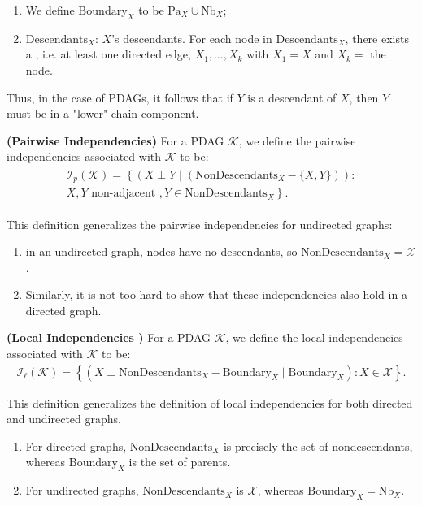 \documentclass{article}
\newcommand{\bfs}[1]{\textbf{({#1}) }}
\begin{document}
\begin{enumerate}
    \item {} We define $\mathrm{Boundary}_{X}$ to be $\mathrm{Pa}_{X} \cup \mathrm{Nb}_{X}$;
    \item $\mathrm{Descendants}_{X}$: $X$'s descendants. For each node in $\mathrm{Descendants}_{X}$, there exists a , i.e. at least one directed edge, $X_{1}, \ldots, X_{k}$ with $X_{1}=X$ and $X_{k}=$ the node. 
\end{enumerate}
Thus, in the case of PDAGs, it follows that if $Y$ is a descendant of $X$, then $Y$ must be in a "lower" chain component.
\begin{defa}\bfs{Pairwise Independencies}
For a PDAG $\mathcal{K}$, we define the pairwise independencies associated with $\mathcal{K}$ to be:
\begin{align*}
\begin{gathered}
\mathcal{I}_{p}(\mathcal{K})=\left\{\left(X \perp Y \mid\left(\mathrm{NonDescendants}_{X}-\{X, Y\}\right)\right):\right. \\
\left.X, Y \text { non-adjacent }, Y \in \mathrm{NonDescendants}_{X}\right\} .
\end{gathered}
\end{align*}
\end{defa}
\begin{rema}
 This definition generalizes the pairwise independencies for undirected graphs: 
 \begin{enumerate}
     \item in an undirected graph, nodes have no descendants, so  $\mathrm{NonDescendants}_{X}=\mathcal{X}$.
     \item Similarly, it is not too hard to show that these independencies also hold in a directed graph.
 \end{enumerate} 
\end{rema}
\begin{defa}\bfs{Local Independencies }
For a PDAG $\mathcal{K}$, we define the local independencies associated with $\mathcal{K}$ to be:
\begin{align*}
\mathcal{I}_{\ell}(\mathcal{K})=\left\{\left(X \perp \mathrm{NonDescendants}_{X}-\mathrm{Boundary}_{X} \mid \mathrm{Boundary}_{X}\right): X \in \mathcal{X}\right\} .
\end{align*}
\end{defa}
\begin{rema}
This definition generalizes the definition of local independencies for both directed and undirected graphs.
\begin{enumerate}
    \item For directed graphs,  $\mathrm{NonDescendants}_{X}$ is precisely the set of nondescendants, whereas  $\mathrm{Boundary}_{X}$ is the set of parents.
    \item For undirected graphs,  $\mathrm{NonDescendants}_{X}$ is $\mathcal{X}$, whereas  $\mathrm{Boundary}_{X}=\mathrm{Nb}_{X}$.
\end{enumerate} 
\end{rema}
\end{document}
